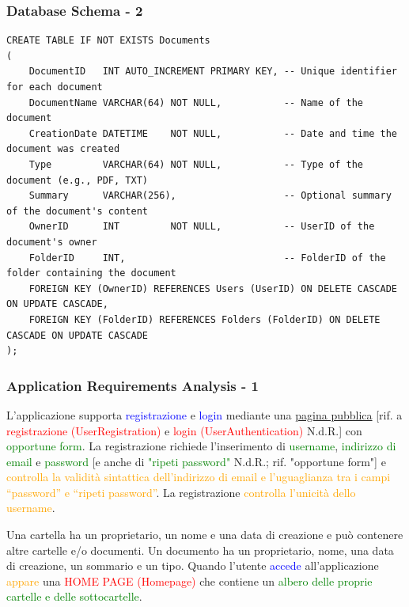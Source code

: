 \documentclass[aspectratio=169, dvipsnames]{beamer}
\begin{document}
\begin{frame}[fragile]
    \frametitle{Database Schema - 2}
    \scriptsize
    \begin{verbatim}
CREATE TABLE IF NOT EXISTS Documents
(
    DocumentID   INT AUTO_INCREMENT PRIMARY KEY, -- Unique identifier for each document
    DocumentName VARCHAR(64) NOT NULL,           -- Name of the document
    CreationDate DATETIME    NOT NULL,           -- Date and time the document was created
    Type         VARCHAR(64) NOT NULL,           -- Type of the document (e.g., PDF, TXT)
    Summary      VARCHAR(256),                   -- Optional summary of the document's content
    OwnerID      INT         NOT NULL,           -- UserID of the document's owner
    FolderID     INT,                            -- FolderID of the folder containing the document
    FOREIGN KEY (OwnerID) REFERENCES Users (UserID) ON DELETE CASCADE ON UPDATE CASCADE,
    FOREIGN KEY (FolderID) REFERENCES Folders (FolderID) ON DELETE CASCADE ON UPDATE CASCADE
);
\end{verbatim}
\end{frame}

\begin{frame}
    \frametitle{Application Requirements Analysis - 1}
    L’applicazione supporta \textcolor{Blue}{registrazione} e \textcolor{Blue}{login} mediante una
    \underline{pagina pubblica} [rif. a \textcolor{Red}{registrazione (UserRegistration)} e
        \textcolor{Red}{login (UserAuthentication)} N.d.R.] con \textcolor{Green}{opportune form}.
    La registrazione richiede l’inserimento di \textcolor{Green}{username}, \textcolor{Green}{indirizzo di email} e
    \textcolor{Green}{password} [e anche di \textcolor{Green}{"ripeti password"} N.d.R.; rif. "opportune form"] e
    \textcolor{Orange}{controlla la validità sintattica dell’indirizzo di email e l’uguaglianza tra i campi “password”
        e “ripeti password”}. La registrazione \textcolor{Orange}{controlla l’unicità dello username}. \newline

    Una cartella ha un proprietario, un nome e una data di creazione e può contenere altre cartelle e/o documenti. Un
    documento ha un proprietario, nome, una data di creazione, un sommario e un tipo.
    Quando l’utente \textcolor{Blue}{accede} all’applicazione \textcolor{Orange}{appare} una
    \textcolor{Red}{HOME PAGE (Homepage)} che contiene un \textcolor{Green}{albero delle proprie cartelle e delle
        sottocartelle}.\footnotemark{}

\end{frame}
\end{document}
